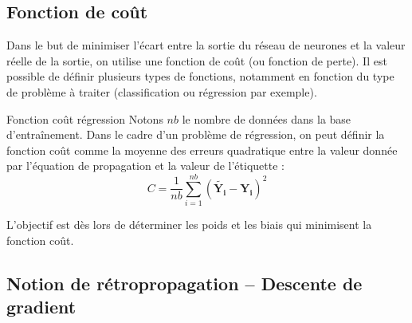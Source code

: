 \subsection{Fonction de coût}
Dans le but de minimiser l'écart entre la sortie du réseau de neurones et la valeur réelle de la sortie, on utilise une fonction de coût (ou fonction de perte). Il est possible de définir plusieurs types de fonctions, notamment en fonction du type de problème à traiter (classification ou régression par exemple).

\begin{defi}{Fonction coût régression}
Notons $nb$ le nombre de données dans la base d'entraînement. Dans le cadre d'un problème de régression, on peut définir la fonction coût comme la moyenne des erreurs quadratique entre la valeur donnée par l'équation de propagation et la valeur de l'étiquette :
$$
C = \dfrac{1}{nb} \sum \limits_{i=1}^{nb} \left( \mathbf{\tilde{Y_i}} - \mathbf{Y_i}  \right)^2
$$
\end{defi}
\begin{obj}
L'objectif est dès lors de déterminer les poids et les biais qui minimisent la fonction coût.
\end{obj}



\subsection{Notion de rétropropagation -- Descente de gradient}

